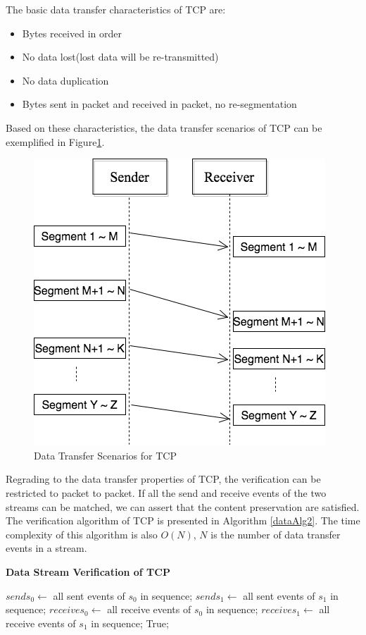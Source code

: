 The basic data transfer characteristics of TCP are:
\begin{itemize}
  \item Bytes received in order
  \item No data lost(lost data will be re-transmitted)
  \item No data duplication
  \item Bytes sent in packet and received in packet, no re-segmentation
\end{itemize}

Based on these characteristics,  the data transfer scenarios of TCP can be exemplified in Figure\ref{tcp}.
\begin{figure}[H]
\centerline{\includegraphics[scale=0.4]{Figures/tcp}}
 \caption{Data Transfer Scenarios for TCP}
\label{tcp}
\end{figure}

Regrading to the data transfer properties of TCP, the verification can be restricted to packet to packet. If all the send and receive events of the two streams can be matched, we can assert that the content preservation are satisfied. The verification algorithm of TCP is presented in Algorithm \ref{dataAlg2}. The time complexity of this algorithm is also $O(N)$, $N$ is the number of data transfer events in a stream.

\begin{algorithm}[H]
\DontPrintSemicolon
\caption{{\bf Data Stream Verification of TCP} \label{dataAlg2}}
\;
$sends_0 \leftarrow$ all sent events of $s_0$ in sequence;\;
$sends_1 \leftarrow$ all sent events of $s_1$ in sequence;\;
$receives_0 \leftarrow$ all receive events of $s_0$ in sequence;\;
$receives_1 \leftarrow$ all receive events of $s_1$ in sequence;\;
 \KwRet True;\;
\end{algorithm} 



